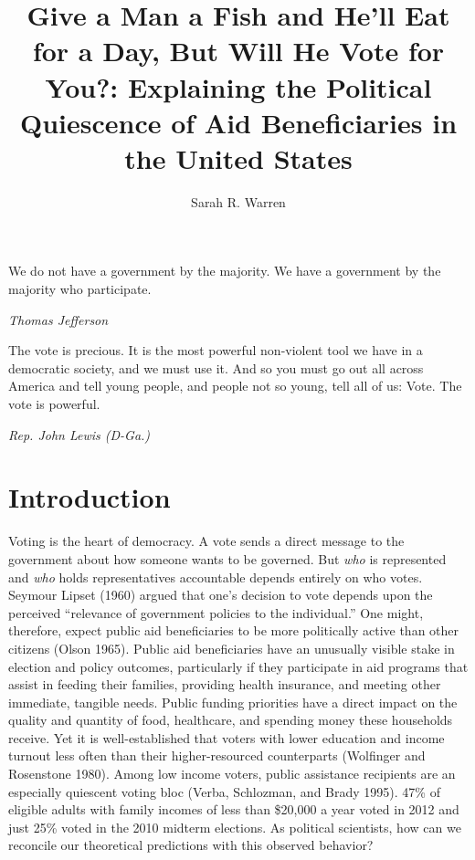 \documentclass[12pt]{paper}
\title{Give a Man a Fish and He'll Eat for a Day, But Will He Vote for You?: Explaining the Political Quiescence of Aid Beneficiaries in the United States}
\author{Sarah R. Warren}
\date{}
\begin{document}
\maketitle

\setlength{}
\epigraph{We do not have a government by the majority. We have a government by the majority who participate.}{\textit{Thomas Jefferson}}

\setlength{}
\epigraph{The vote is precious. It is the most powerful non-violent tool we have in a democratic society, and we must use it. And so you must go out all across America and tell young people, and people not so young, tell all of us: Vote. The vote is powerful.}{\textit{Rep. John Lewis (D-Ga.)}}



\section*{Introduction}
Voting is the heart of democracy. A vote sends a direct message to the government about how someone wants to be governed. But \textit{who} is represented and \textit{who} holds representatives accountable depends entirely on who votes. Seymour Lipset (1960) argued that one's decision to vote depends upon the perceived “relevance of government policies to the individual.” One might, therefore, expect public aid beneficiaries to be more politically active than other citizens (Olson 1965). Public aid beneficiaries have an unusually visible stake in election and policy outcomes, particularly if they participate in aid programs that assist in feeding their families, providing health insurance, and meeting other immediate, tangible needs. Public funding priorities have a direct impact on the quality and quantity of food, healthcare, and spending money these households receive. Yet it is well-established that voters with lower education and income turnout less often than their higher-resourced counterparts (Wolfinger and Rosenstone 1980). Among low income voters, public assistance recipients are an especially quiescent voting bloc (Verba, Schlozman, and Brady 1995). 47\% of eligible adults with family incomes of less than \$20,000 a year voted in 2012 and just 25\% voted in the 2010 midterm elections. As political scientists, how can we reconcile our theoretical predictions with this observed behavior?
\end{document}
